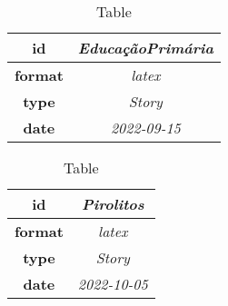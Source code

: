\begin{table}[h]
    \centering
    \begin{tabular}{|c|c|}
        \hline
        
            \textbf{ id } & \textit{ EducaçãoPrimária } \\
            \hline
        
            \textbf{ format } & \textit{ latex } \\
            \hline
        
            \textbf{ type } & \textit{ Story } \\
            \hline
        
            \textbf{ date } & \textit{ 2022-09-15 } \\
            \hline
        
    \end{tabular}
    \caption{Table } %
    \label{table:\arabic{tablecounter2}} %
\end{table}

\begin{table}[h]
    \centering
    \begin{tabular}{|c|c|}
        \hline
        
            \textbf{ id } & \textit{ Pirolitos } \\
            \hline
        
            \textbf{ format } & \textit{ latex } \\
            \hline
        
            \textbf{ type } & \textit{ Story } \\
            \hline
        
            \textbf{ date } & \textit{ 2022-10-05 } \\
            \hline
        
    \end{tabular}
    \caption{Table } %
    \label{table:\arabic{tablecounter2}} %
\end{table}

